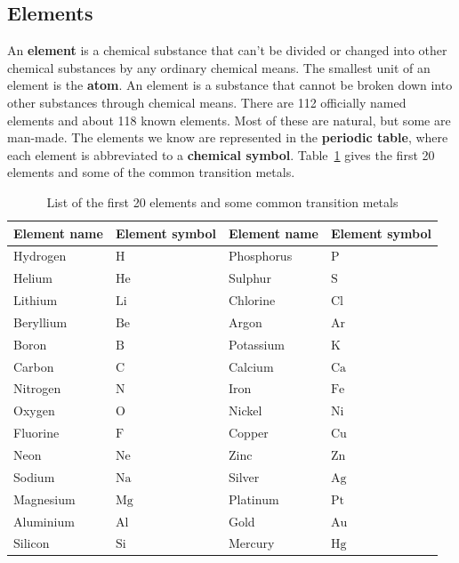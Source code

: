             \subsection*{Elements}
            \nopagebreak
An \textbf{element} is a chemical substance that can't be divided or changed into other chemical substances by any ordinary chemical means. The smallest unit of an element is the \textbf{atom}.
 {An element is a substance that cannot be broken down into other substances through chemical means.} 
There are 112 officially named elements and about 118 known elements. Most of these are natural, but some are man-made. The elements we know are represented in the \textbf{periodic table}, where each element is abbreviated to a \textbf{chemical symbol}. Table~\ref{tab:elements} gives the first 20 elements and some of the common transition metals.
\begin{table}[H]
\label{tab:elements}
\begin{center}
\begin{tabular}{|l|l|l|l|}\hline
\textbf{Element name} & \textbf{Element symbol} & \textbf{Element name} & \textbf{Element symbol} \\ \hline
Hydrogen & $\text{H}$ & Phosphorus & $\text{P}$  \\ \hline
Helium & $\text{He}$ & Sulphur & $\text{S}$ \\ \hline
Lithium & $\text{Li}$ & Chlorine & $\text{Cl}$ \\ \hline
Beryllium & $\text{Be}$ & Argon & $\text{Ar}$ \\ \hline 
Boron & $\text{B}$ & Potassium & $\text{K}$ \\ \hline
Carbon & $\text{C}$ & Calcium & $\text{Ca}$ \\ \hline 
Nitrogen & $\text{N}$ & Iron & $\text{Fe}$ \\ \hline
Oxygen & $\text{O}$ & Nickel & $\text{Ni}$ \\ \hline 
Fluorine & $\text{F}$ & Copper & $\text{Cu}$ \\ \hline
Neon & $\text{Ne}$  & Zinc & $\text{Zn}$ \\ \hline
Sodium & $\text{Na}$  & Silver & $\text{Ag}$ \\ \hline
Magnesium & $\text{Mg}$  & Platinum & $\text{Pt}$ \\ \hline
Aluminium & $\text{Al}$ & Gold & $\text{Au}$ \\ \hline
Silicon & $\text{Si}$ & Mercury & $\text{Hg}$  \\ \hline
\end{tabular}
\end{center}
\caption{List of the first 20 elements and some common transition metals}
\end{table}


